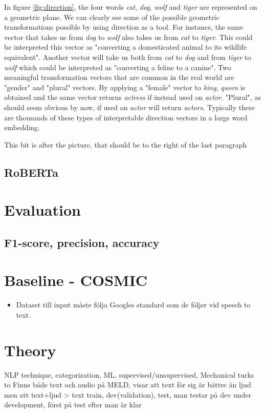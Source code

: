\documentclass[nofilelist]{cslthse-msc}
\begin{document}
In figure \ref{fig:direction}, the four words \textit{cat}, \textit{dog}, \textit{wolf} and \textit{tiger} are represented on a geometric plane. We can clearly see some of the possible geometric transformations possible by using direction as a tool. For instance, the same vector that takes us from \textit{dog} to \textit{wolf} also takes us from \textit{cat} to \textit{tiger}. This could be interpreted this vector as "converting a domesticated animal to its wildlife equivalent". Another vector will take us both from \textit{cat} to \textit{dog} and from \textit{tiger} to \textit{wolf} which could be interpreted as "converting a feline to a canine". Two meaningful transformation vectors that are common in the real world are "gender" and "plural" vectors. By applying a "female" vector to \textit{king}, \textit{queen} is obtained and the same vector returns \textit{actress} if instead used on \textit{actor}. "Plural", as should seem obvious by now, if used on \textit{actor} will return \textit{actors}. Typically there are thousands of these types of interpretable direction vectors in a large word embedding.


This bit is after the picture, that should be to the right of the last paragraph

\subsection{RoBERTa}

\section{Evaluation}
\subsection{F1-score, precision, accuracy}


\section{Baseline - COSMIC}
\begin{itemize}
    \item Dataset till input måste följa Googles standard som de följer vid speech to text. 
\end{itemize}

\section{Theory}
NLP technique, categorization, ML, supervised/unsupervised,  
Mechanical turks to 
Finns både text och audio på MELD, \citep{zhang2019modeling} visar att text för sig är bättre än ljud men att text+ljud > text
train, dev(validation), test, man testar på dev under development, först på test efter man är klar
\end{document}
